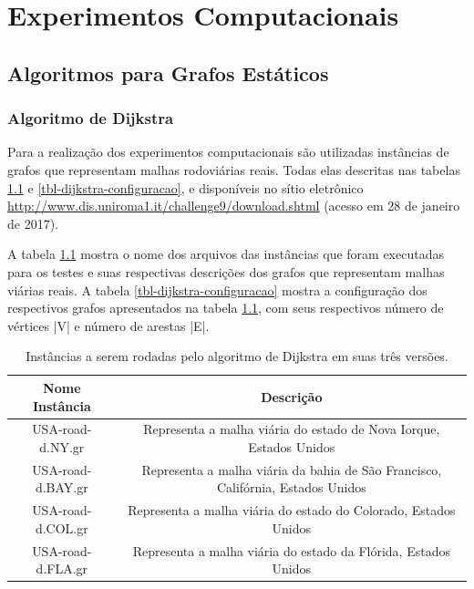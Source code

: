\chapter{Experimentos Computacionais}
\label{sec-testes}

\section{Algoritmos para Grafos Estáticos}
\label{sec-experimentos-algoritmosestaticos}

\subsection{Algoritmo de Dijkstra}
\label{sec-dijkstra-experimentos}
Para a realização dos experimentos computacionais são utilizadas instâncias de grafos que representam malhas rodoviárias reais. Todas elas descritas nas tabelas \ref{tbl-dijkstra-instancias} e \ref{tbl-dijkstra-configuracao}, e disponíveis no sítio eletrônico \url{http://www.dis.uniroma1.it/challenge9/download.shtml} (acesso em 28 de janeiro de 2017).

A tabela \ref{tbl-dijkstra-instancias} mostra o nome dos arquivos das instâncias que foram executadas para os testes e suas respectivas descrições dos grafos que representam malhas viárias reais. A tabela \ref{tbl-dijkstra-configuracao} mostra a configuração dos respectivos grafos apresentados na tabela \ref{tbl-dijkstra-instancias}, com seus respectivos número de vértices |V| e número de arestas |E|.
\begin{table}[H]
\caption{Instâncias a serem rodadas pelo algoritmo de Dijkstra em suas três versões.}
\label{tbl-dijkstra-instancias}
\centering
\begin{adjustbox}{max width=\textwidth}
\begin{tabular}{|c|c|}
\hline 
\textbf{Nome Instância} & \textbf{Descrição} \\ 
\hline 
USA-road-d.NY.gr & Representa a malha viária do estado de Nova Iorque, Estados Unidos \\ 
\hline 
USA-road-d.BAY.gr & Representa a malha viária da bahia de São Francisco, Califórnia, Estados Unidos \\ 
\hline 
USA-road-d.COL.gr & Representa a malha viária do estado do Colorado, Estados Unidos \\ 
\hline 
USA-road-d.FLA.gr & Representa a malha viária do estado da Flórida, Estados Unidos \\ 
\hline 
\end{tabular}
\end{adjustbox}
\end{table}

